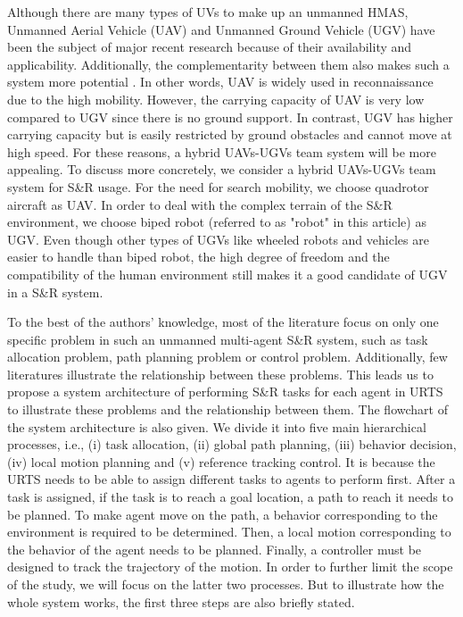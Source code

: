 \documentclass{ieeeaccess}
\begin{document}
Although there are many types of UVs to make up an unmanned HMAS, Unmanned Aerial Vehicle (UAV) and Unmanned Ground Vehicle (UGV) have been the subject of major recent research because of their availability and applicability. Additionally, the complementarity between them also makes such a system more potential \cite{arbanas2018decentralized}. In other words, UAV is widely used in reconnaissance due to the high mobility. However, the carrying capacity of UAV is very low compared to UGV since there is no ground support. In contrast, UGV has higher carrying capacity but is easily restricted by ground obstacles and cannot move at high speed. For these reasons, a hybrid UAVs-UGVs team system will be more appealing. To discuss more concretely, we consider a hybrid UAVs-UGVs team system for S\&R usage. For the need for search mobility, we choose quadrotor aircraft as UAV. In order to deal with the complex terrain of the S\&R environment, we choose biped robot (referred to as "robot" in this article) as UGV. Even though other types of UGVs like wheeled robots and vehicles are easier to handle than biped robot, the high degree of freedom and the compatibility of the human environment still makes it a good candidate of UGV in a S\&R system.

To the best of the authors' knowledge, most of the literature focus on only one specific problem in such an unmanned multi-agent S\&R system, such as task allocation problem, path planning problem or control problem. Additionally, few literatures illustrate the relationship between these problems. This leads us to propose a system architecture of performing S\&R tasks for each agent in URTS to illustrate these problems and the relationship between them. The flowchart of the system architecture is also given. We divide it into five main hierarchical processes, i.e., (i) task allocation, (ii) global path planning, (iii) behavior decision, (iv) local motion planning and (v) reference tracking control. It is because the URTS needs to be able to assign different tasks to agents to perform first. After a task is assigned, if the task is to reach a goal location, a path to reach it needs to be planned. To make agent move on the path, a behavior corresponding to the environment is required to be determined. Then, a local motion corresponding to the behavior of the agent needs to be planned. Finally, a controller must be designed to track the trajectory of the motion. In order to further limit the scope of the study, we will focus on the latter two processes. But to illustrate how the whole system works, the first three steps are also briefly stated.
\end{document}
